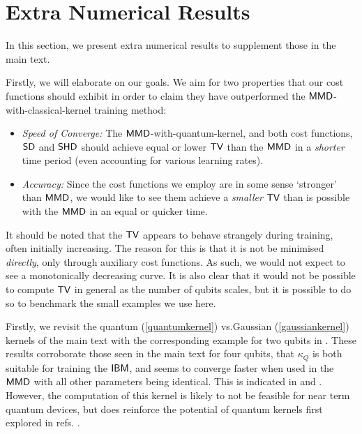 
\section{Extra Numerical Results \label{supp_matt:numericalresults}}

In this section, we present extra numerical results to supplement those in the main text. 

Firstly, we will elaborate on our goals. We aim for two properties that our cost functions should exhibit in order to claim they have outperformed the $\operatorname{\textsf{MMD}}$-with-classical-kernel training method:
\begin{itemize}
    \item \textit{Speed of Converge:} The $\operatorname{\textsf{MMD}}$-with-quantum-kernel, and both cost functions, $\operatorname{\textsf{SD}}$ and $\operatorname{\textsf{SHD}}$ should achieve equal or lower $\operatorname{\textsf{TV}}$ than the $\operatorname{\textsf{MMD}}$ in a \textit{shorter} time period (even accounting for various learning rates).
    \item \textit{Accuracy:} Since the cost functions we employ are in some sense `stronger' than $\operatorname{\textsf{MMD}}$, we would like to see them achieve a \textit{smaller} $\operatorname{\textsf{TV}}$ than is possible with the $\operatorname{\textsf{MMD}}$ in an equal or quicker time. %
\end{itemize}

It should be noted that the $\operatorname{\textsf{TV}}$ appears to behave strangely during training, often initially increasing. The reason for this is that it is not be minimised \textit{directly}, only through auxiliary cost functions. As such, we would not expect to see a monotonically decreasing curve. It is also clear that it would not be possible to compute $\operatorname{\textsf{TV}}$ in general as the number of qubits scales, but it is possible to do so to benchmark the small examples we use here. 


Firstly, we revisit the quantum (\eqref{quantumkernel}) vs.\@ Gaussian  (\eqref{gaussiankernel}) kernels of the main text with the corresponding example for two qubits in . These results corroborate those seen in the main text for four qubits, that $\kappa_Q$ is both suitable for training the $\textsf{IBM}$, and seems to converge faster when used in the $\operatorname{\textsf{MMD}}$ with all other parameters being identical. This is indicated in  and . However, the computation of this kernel is likely to not be feasible for near term quantum devices, but does reinforce the potential of quantum kernels first explored in refs. . 

